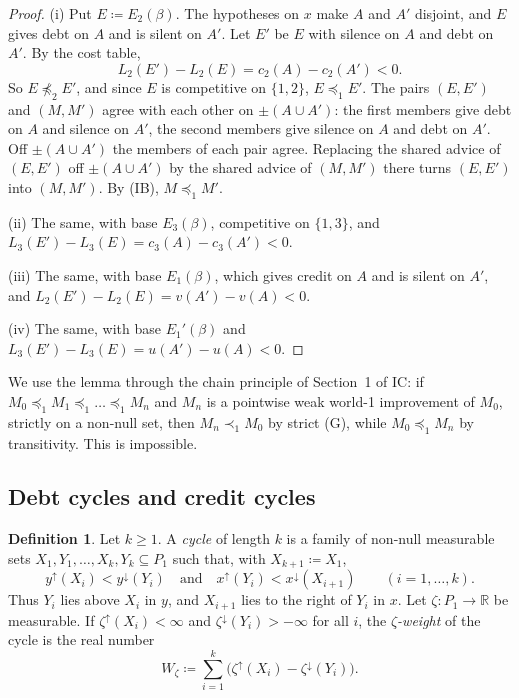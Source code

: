 \documentclass[11pt]{article}
\theoremstyle{definition}\newtheorem{definition}[theorem]{Definition}
\theoremstyle{remark}\newtheorem{remark}[theorem]{Remark}
\begin{document}
\begin{proof}
(i) Put $E\coloneqq E_2(\beta)$. The hypotheses on $x$ make $A$ and $A'$
disjoint, and $E$ gives debt on $A$ and is silent on $A'$. Let $E'$ be $E$
with silence on $A$ and debt on $A'$. By the cost table,
\[
 L_2(E')-L_2(E)=c_2(A)-c_2(A')<0 .
\]
So $E\not\preceq_2E'$, and since $E$ is competitive on $\{1,2\}$,
$E\preceq_1E'$. The pairs $(E,E')$ and $(M,M')$ agree with each other on
$\pm(A\cup A')$: the first members give debt on $A$ and silence on $A'$, the
second members give silence on $A$ and debt on $A'$. Off $\pm(A\cup A')$ the
members of each pair agree. Replacing the shared advice of $(E,E')$ off
$\pm(A\cup A')$ by the shared advice of $(M,M')$ there turns $(E,E')$ into
$(M,M')$. By (IB), $M\preceq_1M'$.

(ii) The same, with base $E_3(\beta)$, competitive on $\{1,3\}$, and
$L_3(E')-L_3(E)=c_3(A)-c_3(A')<0$.

(iii) The same, with base $E_1(\beta)$, which gives credit on $A$ and is
silent on $A'$, and $L_2(E')-L_2(E)=v(A')-v(A)<0$.

(iv) The same, with base $E_1'(\beta)$ and $L_3(E')-L_3(E)=u(A')-u(A)<0$.
\end{proof}

We use the lemma through the chain principle of Section~1 of IC:
if $M_0\preceq_1M_1\preceq_1\dots\preceq_1M_n$ and $M_n$ is a pointwise weak
world-1 improvement of $M_0$, strictly on a non-null set, then
$M_n\prec_1M_0$ by strict (G), while $M_0\preceq_1M_n$ by transitivity. This
is impossible.

\subsection{Debt cycles and credit cycles}

\begin{definition}\label{def:sep-cycle}
Let $k\ge1$. A \emph{cycle} of length $k$ is a family of non-null measurable
sets $X_1,Y_1,\dots,X_k,Y_k\subseteq P_1$ such that, with
$X_{k+1}\coloneqq X_1$,
\[
 y^{\uparrow}(X_i)<y^{\downarrow}(Y_i)\quad\text{and}\quad
 x^{\uparrow}(Y_i)<x^{\downarrow}(X_{i+1})\qquad(i=1,\dots,k).
\]
Thus $Y_i$ lies above $X_i$ in $y$, and $X_{i+1}$ lies to the right of $Y_i$
in $x$. Let $\zeta\colon P_1\to\mathbb R$ be measurable. If
$\zeta^{\uparrow}(X_i)<\infty$ and $\zeta^{\downarrow}(Y_i)>-\infty$ for all
$i$, the \emph{$\zeta$-weight} of the cycle is the real number
\[
 W_\zeta\coloneqq\sum_{i=1}^k\bigl(\zeta^{\uparrow}(X_i)-\zeta^{\downarrow}(Y_i)\bigr).
\]
\end{definition}
\end{document}
